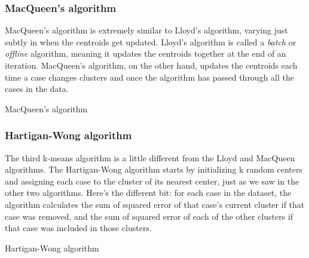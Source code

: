 \subsubsection*{MacQueen’s algorithm}
MacQueen’s algorithm is extremely similar to Lloyd’s algorithm, varying just subtly in when the centroids get updated. Lloyd’s algorithm is called a \textit{batch} or \textit{offline} algorithm, meaning it updates the centroids together at the end of an iteration. MacQueen’s algorithm, on the other hand, updates the centroids each time a case changes clusters and once the algorithm has passed through all the cases in the data.
\begin{algorithm}
    \caption{MacQueen’s algorithm\label{MacQueen}}
\end{algorithm}
\subsubsection*{Hartigan-Wong algorithm}
The third k-means algorithm is a little different from the Lloyd and MacQueen algorithms. The Hartigan-Wong algorithm starts by initializing k random centers and assigning each case to the cluster of its nearest center, just as we saw in the other two algorithms. Here’s the different bit: for each case in the dataset, the algorithm calculates the sum of squared error of that case’s current cluster if that case was removed, and the sum of squared error of each of the other clusters if that case was included in those clusters.
\begin{algorithm}
    \caption{Hartigan-Wong algorithm\label{Hartigan}}
\end{algorithm}

